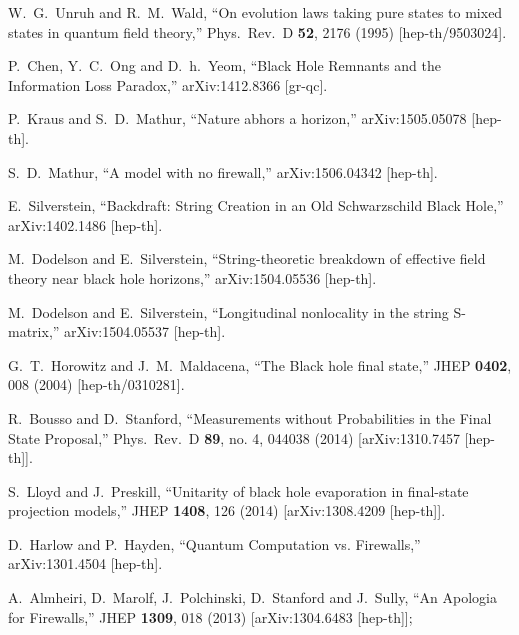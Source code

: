 \documentclass[12pt]{article}
\begin{document}
\begin{thebibliography}{99}
  W.~G.~Unruh and R.~M.~Wald,
  ``On evolution laws taking pure states to mixed states in quantum field theory,''
  Phys.\ Rev.\ D {\bf 52}, 2176 (1995)
  [hep-th/9503024].
  
  P.~Chen, Y.~C.~Ong and D.~h.~Yeom,
  ``Black Hole Remnants and the Information Loss Paradox,''
  arXiv:1412.8366 [gr-qc].
 
  P.~Kraus and S.~D.~Mathur,
  ``Nature abhors a horizon,''
  arXiv:1505.05078 [hep-th].
  
  S.~D.~Mathur,
  ``A model with no firewall,''
  arXiv:1506.04342 [hep-th].
  
  E.~Silverstein,
  ``Backdraft: String Creation in an Old Schwarzschild Black Hole,''
  arXiv:1402.1486 [hep-th].
  
M.~Dodelson and E.~Silverstein,
  ``String-theoretic breakdown of effective field theory near black hole horizons,''
  arXiv:1504.05536 [hep-th].

 M.~Dodelson and E.~Silverstein,
  ``Longitudinal nonlocality in the string S-matrix,''
  arXiv:1504.05537 [hep-th].
  
  G.~T.~Horowitz and J.~M.~Maldacena,
  ``The Black hole final state,''
  JHEP {\bf 0402}, 008 (2004)
  [hep-th/0310281].
  
  R.~Bousso and D.~Stanford,
  ``Measurements without Probabilities in the Final State Proposal,''
  Phys.\ Rev.\ D {\bf 89}, no. 4, 044038 (2014)
  [arXiv:1310.7457 [hep-th]].
  
  S.~Lloyd and J.~Preskill,
  ``Unitarity of black hole evaporation in final-state projection models,''
  JHEP {\bf 1408}, 126 (2014)
  [arXiv:1308.4209 [hep-th]].
  
  D.~Harlow and P.~Hayden,
  ``Quantum Computation vs. Firewalls,''
  arXiv:1301.4504 [hep-th].
  
A.~Almheiri, D.~Marolf, J.~Polchinski, D.~Stanford and J.~Sully,
  ``An Apologia for Firewalls,''
  JHEP {\bf 1309}, 018 (2013)
  [arXiv:1304.6483 [hep-th]];


\end{thebibliography}
\end{document}
